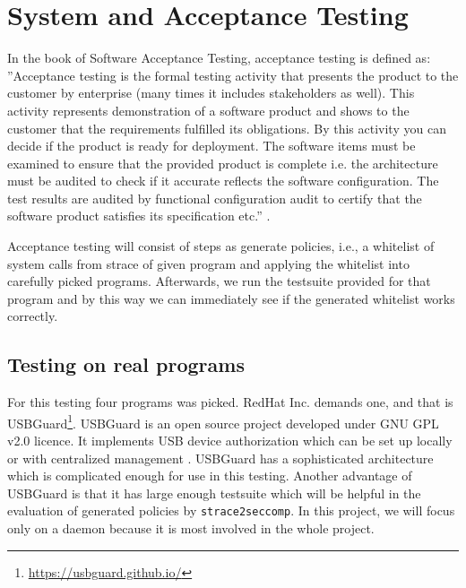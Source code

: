 
\section{System and Acceptance Testing}
\label{acceptance_testing}
In the book of Software Acceptance Testing, acceptance testing is defined as:
''Acceptance testing is the formal testing activity that presents the
product to the customer by enterprise (many times it includes stakeholders as
well). This activity represents demonstration of a software product and shows to
the customer that the requirements fulfilled its obligations. By this activity
you can decide if the product is ready for deployment. The software items must
be examined to ensure that the provided product is complete i.e. the
architecture must be audited to check if it accurate reflects the software
configuration. The test results are audited by functional configuration audit to
certify that the software product satisfies its specification etc.''
\cite{Schmidt2013335}.

Acceptance testing will consist of steps as generate policies, i.e., a whitelist
of system calls from strace of given program and applying the whitelist into
carefully picked programs. Afterwards, we run the testsuite provided for that
program and by this way we can immediately see if the generated whitelist works
correctly.

\subsection{Testing on real programs}
For this testing four programs was picked. RedHat Inc. demands one, and that is
USBGuard\footnote{\url{https://usbguard.github.io/}}. USBGuard is an open source
project developed under GNU GPL v2.0 licence. It implements USB device
authorization which can be set up locally or with centralized
management \cite{usbguardCentralized}. USBGuard has a sophisticated architecture
which is complicated enough for use in this testing. Another advantage of
USBGuard is that it has large enough testsuite which will be helpful in the
evaluation of generated policies by \texttt{strace2seccomp}. In this project, we
will focus only on a daemon because it is most involved in the whole project.

